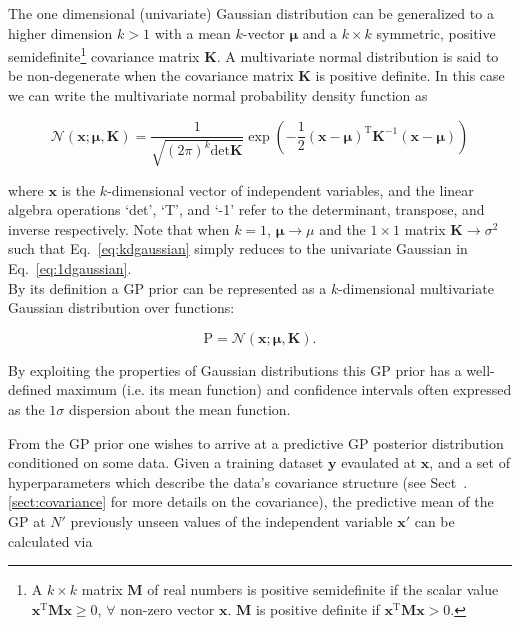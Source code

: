 The one dimensional (univariate) Gaussian distribution can be generalized to a higher 
dimension $k > 1$ with a mean $k$-vector $\boldsymbol{\mu}$ and a $k \times k$ 
symmetric, positive semidefinite\footnote{A $k \times k$ matrix $\mathbf{M}$ of real numbers 
is positive semidefinite if the scalar value $\mathbf{x}^{\mathrm{T}}\mathbf{M} \mathbf{x} \geq 0$, $\forall$ 
non-zero vector $\mathbf{x}$. 
$\mathbf{M}$ is positive definite if $\mathbf{x}^{\mathrm{T}}\mathbf{M} \mathbf{x} > 0$.} 
covariance matrix $\mathbf{K}$. 
A multivariate normal distribution is said to be non-degenerate when the covariance 
matrix $\mathbf{K}$ is positive definite. In this case we can write 
the multivariate normal probability density function as 

\begin{equation}
\mathcal{N}(\mathbf{x}; \boldsymbol{\mu}, \mathbf{K}) = \frac{1}{\sqrt{(2 \pi)^{k} \mathrm{det} \mathbf{K}}}
\exp{\left( -\frac{1}{2} (\mathbf{x} - \boldsymbol{\mu})^{\mathrm{T}} \mathbf{K}^{-1} (\mathbf{x} - 
\boldsymbol{\mu}) \right)}
\label{eq:kdgaussian}
\end{equation}

\noindent where $\mathbf{x}$ is the $k$-dimensional vector of independent variables, 
and the linear algebra operations `det', `T', and `-1' refer to the determinant, transpose, and
inverse respectively. Note that when $k=1$, $\boldsymbol{\mu} \to \mu$ and the $1\times 1$ matrix 
$\mathbf{K} \to \sigma^2$ such that Eq.~\ref{eq:kdgaussian} simply 
reduces to the univariate Gaussian in Eq.~\ref{eq:1dgaussian}. \\

By its definition a GP prior can be represented as a $k$-dimensional multivariate Gaussian
distribution over functions:

\begin{equation}
\text{P} = \mathcal{N}(\mathbf{x}; \boldsymbol{\mu}, \mathbf{K}).
\label{eq:multvar}
\end{equation}

\noindent By exploiting the properties of Gaussian distributions this GP prior has a
well-defined maximum (i.e. its mean function) and confidence intervals often expressed as
the $1\sigma$ dispersion about the mean function. 

From the GP prior one wishes to arrive at a predictive GP posterior distribution conditioned on some
data. Given a training dataset $\mathbf{y}$ evaulated at $\mathbf{x}$, and a set of hyperparameters
which describe the data's covariance structure (see Sect~.\ref{sect:covariance} for more details on
the covariance), the predictive mean of the GP at $N'$ previously unseen values of the independent variable
$\mathbf{x'}$ can be calculated via

